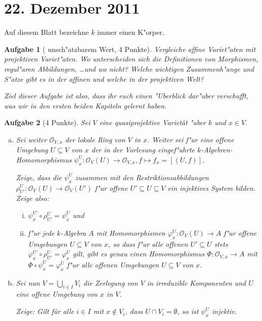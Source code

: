 \documentclass[a4paper, 12pt, numbers=noendperiod, chapterprefix=true, headsepline]{scrbook}
\theoremstyle{break}
\newtheorem{Aufg}{Aufgabe}
\theoremstyle{nonumberbreak}
\theoremstyle{nonumberplain}
\newcommand{\calO}{\mathcal{O}}
\begin{document}
\newpage
\section{22. Dezember 2011}
\setcounter{Aufg}{0}
\setcounter{Loes}{1}

Auf diesem Blatt bezeichne $k$ immer einen K"orper.

\begin{Aufg}[ unsch"atzbarem Wert, 4 Punkte]
Vergleiche affine Variet"aten mit projektiven Variet"aten. Wo unterscheiden sich die Definitionen von Morphismen, regul"aren Abbildungen, \dots und wo nicht? Welche wichtigen Zusammenh"ange und S"atze gibt es in der affinen und welche in der projektiven Welt?

Ziel dieser Aufgabe ist also, dass ihr euch einen "Uberblick dar"uber verschafft, was wir in den ersten beiden Kapiteln gelernt haben.
\end{Aufg}

\begin{Aufg}[4 Punkte]
Sei $V$ eine quasiprojektive Variet\"at "uber $k$ und $x \in V$.
\begin{enumerate}[a)]
	\item Sei weiter $\calO_{V,x}$ der lokale Ring von $V$ in $x$. Weiter sei f"ur eine offene Umgebung $U \subseteq V$ von $x$ der in der Vorlesung eingef"uhrte $k$-Algebren-Homomorphismus $\psi_x^U: \calO_V(U) \to \calO_{V,x}, f \mapsto f_x=[(U,f)]$.  
 
	Zeige, dass die $\psi_x^U$ zusammen mit den Restriktionsabbildungen $\rho^U_{U'}: \calO_V(U) \to \calO_V(U')$ f"ur offene $U' \subseteq U \subseteq V$ ein injektives System bilden. Zeige also:
	\begin{enumerate}[i)]
		\item $\psi_x^{U'} \circ \rho^U_{U'} = \psi_x^U$ und
		\item f"ur jede $k$-Algebra $A$ mit Homomorphismen $\varphi_x^U : \calO_V(U) \to A$ f"ur offene Umgebungen $U \subseteq V$ von $x$, so dass f"ur alle offenen $U' \subseteq U$ stets $\varphi_x^{U'} \circ \rho^U_{U'} = \varphi_x^U$ gilt, gibt es genau einen Homomorphismus $\Phi : \calO_{V,x} \to A$ mit $\Phi \circ \psi_x^U = \varphi_x^U$ f"ur alle offenen Umgebungen $U \subseteq V$ von $x$.
	\end{enumerate}
	\item Sei nun $V = \bigcup_{i \in I} V_i$ die Zerlegung von $V$ in irreduzible Komponenten und $U$ eine offene Umgebung von $x$ in $V$. 

	Zeige: Gilt für alle $i \in I$ mit $x \notin V_i$, dass $U \cap V_i = \emptyset$, so ist $\psi^U_x$ injektiv.
\end{enumerate}\end{Aufg}
\end{document}
